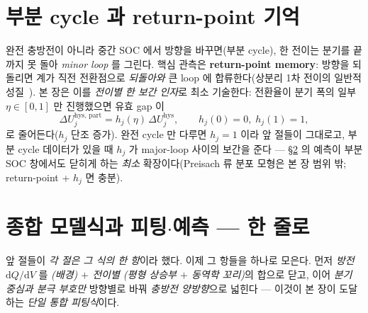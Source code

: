 \documentclass[11pt,a4paper]{article}
\newcommand{\dd}{\mathrm{d}}
\newcommand{\hys}{\mathrm{hys}}
\begin{document}
\section{부분 cycle 과 return-point 기억}\label{sec:hys_partial}
완전 충방전이 아니라 중간 SOC 에서 방향을 바꾸면(부분 cycle), 한 전이는 분기를 끝까지 못 돌아 \emph{minor loop}
를 그린다. 핵심 관측은 \textbf{return-point memory}: 방향을 되돌리면 계가 직전 전환점으로 \emph{되돌아와} 큰 loop
에 합류한다(상분리 1차 전이의 일반적 성질~\cite{sethna1993}). 본 장은 이를 \emph{전이별 한 보간 인자}로 최소
기술한다: 전환율이 분기 폭의 일부 $\eta\in[0,1]$ 만 진행했으면 유효 gap 이
\begin{equation}
\Delta U_{j}^{\hys,\,\mathrm{part}}=h_j(\eta)\,\Delta U_j^\hys,\qquad h_j(0)=0,\;h_j(1)=1,
\label{eq:hys_partial}
\end{equation}
로 줄어든다($h_j$ 단조 증가). 완전 cycle 만 다루면 $h_j=1$ 이라 앞 절들이 그대로고, 부분 cycle 데이터가 있을 때
$h_j$ 가 major-loop 사이의 보간을 준다 — \S\ref{sec:master} 의 예측이 부분 SOC 창에서도 닫히게 하는 \emph{최소}
확장이다(Preisach 류 분포 모형은 본 장 범위 밖; return-point + $h_j$ 면 충분).

\section{종합 모델식과 피팅$\cdot$예측 — 한 줄로}\label{sec:master}
앞 절들이 \emph{각 절은 그 식의 한 항}이라 했다. 이제 그 항들을 하나로 모은다. 먼저 \emph{방전} $\dd Q/\dd V$ 를
\emph{(배경) $+$ 전이별 (평형 상승부 $+$ 동역학 꼬리)}의 합으로 닫고, 이어 \emph{분기 중심과 분극 부호만} 방향별로
바꿔 \emph{충방전 양방향}으로 넓힌다 — 이것이 본 장이 도달하는 \emph{단일 통합 피팅식}이다.
\end{document}

